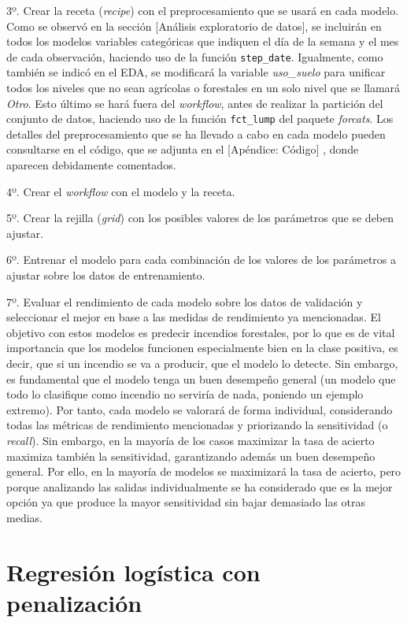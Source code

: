 \documentclass[12pt,a4paper,]{book}
\numberwithin{dummy}{section}
\theoremstyle{ocrenumbox}
\theoremstyle{blacknumex}
\theoremstyle{blacknumbox}
\theoremstyle{ocrenum}
\theoremstyle{ocrenum}
\begin{document}
3º. Crear la receta (\emph{recipe}) con el preprocesamiento que se usará
en cada modelo. Como se observó en la sección {[}Análisis exploratorio
de datos{]}, se incluirán en todos los modelos variables categóricas que
indiquen el día de la semana y el mes de cada observación, haciendo uso
de la función \texttt{step\_date}. Igualmente, como también se indicó en
el EDA, se modificará la variable \emph{uso\_suelo} para unificar todos
los niveles que no sean agrícolas o forestales en un solo nivel que se
llamará \emph{Otro}. Esto último se hará fuera del \emph{workflow},
antes de realizar la partición del conjunto de datos, haciendo uso de la
función \texttt{fct\_lump} del paquete \emph{forcats}. Los detalles del
preprocesamiento que se ha llevado a cabo en cada modelo pueden
consultarse en el código, que se adjunta en el {[}Apéndice: Código{]} ,
donde aparecen debidamente comentados.

4º. Crear el \emph{workflow} con el modelo y la receta.

5º. Crear la rejilla (\emph{grid}) con los posibles valores de los
parámetros que se deben ajustar.

6º. Entrenar el modelo para cada combinación de los valores de los
parámetros a ajustar sobre los datos de entrenamiento.

7º. Evaluar el rendimiento de cada modelo sobre los datos de validación
y seleccionar el mejor en base a las medidas de rendimiento ya
mencionadas. El objetivo con estos modelos es predecir incendios
forestales, por lo que es de vital importancia que los modelos funcionen
especialmente bien en la clase positiva, es decir, que si un incendio se
va a producir, que el modelo lo detecte. Sin embargo, es fundamental que
el modelo tenga un buen desempeño general (un modelo que todo lo
clasifique como incendio no serviría de nada, poniendo un ejemplo
extremo). Por tanto, cada modelo se valorará de forma individual,
considerando todas las métricas de rendimiento mencionadas y priorizando
la sensitividad (o \emph{recall}). Sin embargo, en la mayoría de los
casos maximizar la tasa de acierto maximiza también la sensitividad,
garantizando además un buen desempeño general. Por ello, en la mayoría
de modelos se maximizará la tasa de acierto, pero porque analizando las
salidas individualmente se ha considerado que es la mejor opción ya que
produce la mayor sensitividad sin bajar demasiado las otras medias.

\hypertarget{regresiuxf3n-loguxedstica-con-penalizaciuxf3n}{%
\section{Regresión logística con
penalización}\label{regresiuxf3n-loguxedstica-con-penalizaciuxf3n}}
\end{document}

